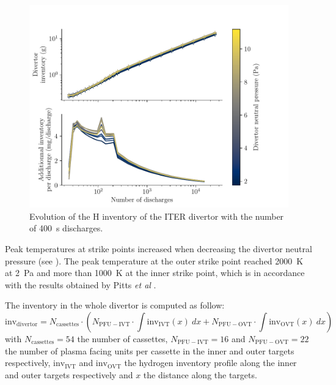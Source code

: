 \begin{figure}[h!]
    \centering
    \includegraphics[width=\linewidth]{Figures/Chapter4/ITER/inventory_vs_time.pdf}
    \caption{Evolution of the H inventory of the ITER divertor with the number of \SI{400}{s} discharges.}
\end{figure}


Peak temperatures at strike points increased when decreasing the divertor neutral pressure (see ).
The peak temperature at the outer strike point reached \SI{2000}{K} at \SI{2}{Pa} and more than \SI{1000}{K} at the inner strike point, which is in accordance with the results obtained by Pitts \textit{et al} .

The inventory in the whole divertor is computed as follow:
\begin{equation}
    \mathrm{inv_{divertor}} = N_\mathrm{cassettes} \cdot \left( N_\mathrm{PFU-IVT} \cdot \int \mathrm{inv_{IVT}}(x)\: dx + N_\mathrm{PFU-OVT} \cdot\int \mathrm{inv_{OVT}}(x) \: dx \right)
\end{equation}
with $N_\mathrm{cassettes}=54$ the number of cassettes, $N_\mathrm{PFU-IVT}=16$ and $N_\mathrm{PFU-OVT}=22$ the number of plasma facing units per cassette in the inner and outer targets respectively, $\mathrm{inv_{IVT}}$ and $\mathrm{inv_{OVT}}$ the hydrogen inventory profile along the inner and outer targets respectively and $x$ the distance along the targets.

